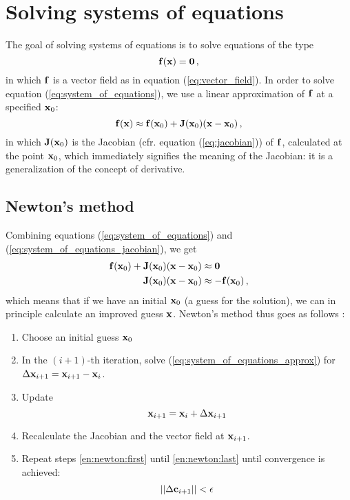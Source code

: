 \section{Solving systems of equations}
    The goal of solving systems of equations is to solve equations of the type
    \begin{equation} \label{eq:system_of_equations}
        \vb{f}(\vb{x}) = \vb{0} \thinspace ,
    \end{equation}
    in which $\vb{f}$ is a vector field as in equation (\ref{eq:vector_field}). In order to solve equation (\ref{eq:system_of_equations}), we use a linear approximation of $\vb{f}$ at a specified $\vb{x}_0$:
    \begin{equation} \label{eq:system_of_equations_jacobian}
        \vb{f}(\vb{x}) \approx \vb{f}(\vb{x}_0) + \vb{J}(\vb{x}_0) (\vb{x} - \vb{x}_0) \thinspace ,
    \end{equation}
    in which $\vb{J}(\vb{x}_0)$ is the Jacobian (cfr. equation (\ref{eq:jacobian})) of $\vb{f}$, calculated at the point $\vb{x}_0$, which immediately signifies the meaning of the Jacobian: it is a generalization of the concept of derivative.

    \subsection{Newton's method}
        Combining equations (\ref{eq:system_of_equations}) and (\ref{eq:system_of_equations_jacobian}), we get
        \begin{align}
            \vb{f}(\vb{x}_0) + \vb{J}(\vb{x}_0) (\vb{x} - \vb{x}_0) &\approx \vb{0} \\
            \vb{J}(\vb{x}_0) (\vb{x} - \vb{x}_0) & \approx - \vb{f}(\vb{x}_0) \label{eq:system_of_equations_approx} \thinspace ,
        \end{align}
        which means that if we have an initial $\vb{x}_0$ (a guess for the solution), we can in principle calculate an improved guess $\vb{x}$. Newton's method thus goes as follows \cite{burden2010}:
        \begin{enumerate}
            \item Choose an initial guess $\vb{x}_0$
            \item \label{en:newton:first} In the $(i+1)$-th iteration, solve (\ref{eq:system_of_equations_approx}) for $\Delta \vb{x}_{i+1} = \vb{x}_{i+1} - \vb{x}_i$.
            \item Update
                \begin{equation}
                    \vb{x}_{i+1} = \vb{x}_i + \Delta \vb{x}_{i+1}
                \end{equation}
            \item \label{en:newton:last} Recalculate the Jacobian and the vector field at $\vb{x}_{i+1}$.
            \item Repeat steps \ref{en:newton:first} until \ref{en:newton:last} until convergence is achieved:
                \begin{equation}
                    || \Delta \vb{c}_{i+1} || < \epsilon
                \end{equation}
        \end{enumerate}

